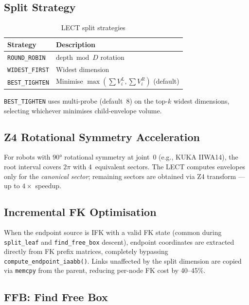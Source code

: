 \documentclass[journal]{IEEEtran}
\begin{document}
\subsection{Split Strategy}

\begin{table}[ht]
\centering
\caption{LECT split strategies}
\label{tab:split}
\begin{tabular}{@{}ll@{}}
\toprule
\textbf{Strategy} & \textbf{Description} \\
\midrule
\texttt{ROUND\_ROBIN} & $\mathrm{depth} \bmod D$ rotation \\
\texttt{WIDEST\_FIRST} & Widest dimension \\
\texttt{BEST\_TIGHTEN} & Minimise $\max(\sum V_i^L, \sum V_i^R)$
  (default) \\
\bottomrule
\end{tabular}
\end{table}

\texttt{BEST\_TIGHTEN} uses multi-probe (default~8) on the top-$k$
widest dimensions, selecting whichever minimises child-envelope volume.

\subsection{Z4 Rotational Symmetry Acceleration}

For robots with $90°$ rotational symmetry at joint~0 (e.g., KUKA IIWA14),
the root interval covers $2\pi$ with 4~equivalent sectors.
The LECT computes envelopes only for the \emph{canonical sector};
remaining sectors are obtained via Z4 transform --- up to $4{\times}$
speedup.

\subsection{Incremental FK Optimisation}

When the endpoint source is IFK with a valid FK state (common during
\texttt{split\_leaf} and \texttt{find\_free\_box} descent), endpoint
coordinates are extracted directly from FK prefix matrices, completely
bypassing \texttt{compute\_endpoint\_iaabb()}.
Links unaffected by the split dimension are copied via
\texttt{memcpy} from the parent, reducing per-node FK cost by
40--45\%.

\subsection{FFB: Find Free Box}\label{sec:ffb}
\end{document}
